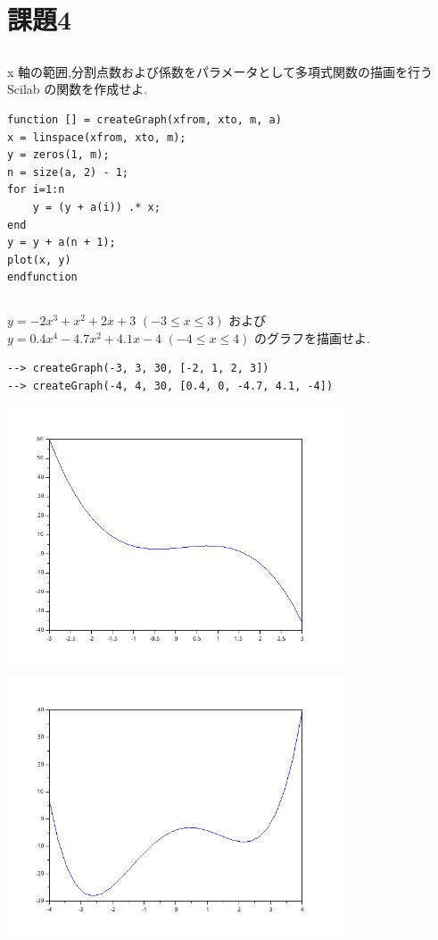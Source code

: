 \documentclass[a4j, 11pt]{jarticle}
\begin{document}
\section{課題4}
\label{sec:org4d9470c}
\subsection{}
\label{sec:org7fbc936}
x 軸の範囲,分割点数および係数をパラメータとして多項式関数の描画を行う Scilab の関数を作成せよ.\\
\begin{verbatim}
function [] = createGraph(xfrom, xto, m, a)
x = linspace(xfrom, xto, m);
y = zeros(1, m);
n = size(a, 2) - 1;
for i=1:n
    y = (y + a(i)) .* x;
end
y = y + a(n + 1);
plot(x, y)
endfunction
\end{verbatim}
\subsection{}
\label{sec:org4512a98}
\(y=-2x^3+x^2+2x+3\) \((-3\leq x\leq 3)\) および\\
\(y = 0.4x^4 - 4.7 x^2 + 4.1x - 4\) \(( -4 \leq x \leq 4)\) のグラフを描画せよ.\\
\begin{verbatim}
--> createGraph(-3, 3, 30, [-2, 1, 2, 3])
--> createGraph(-4, 4, 30, [0.4, 0, -4.7, 4.1, -4])
\end{verbatim}
\begin{center}
\includegraphics[width=10cm]{./4-1.png}
\end{center}
\begin{center}
\includegraphics[width=10cm]{./4-2.png}
\end{center}
\end{document}
